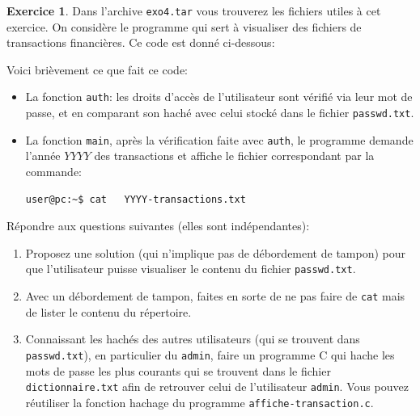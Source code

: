 \documentclass[a4paper,9pt]{article}
\theoremstyle{plain}
\theoremstyle{definition}
\newtheorem{exercice}{Exercice}
\begin{document}
\begin{exercice}
  Dans l'archive \verb|exo4.tar| vous trouverez les fichiers utiles à cet exercice. On considère le programme  qui sert à visualiser des fichiers de transactions financières. Ce code est donné ci-dessous:
  \begin{small}
    
    \end{small}
% 
% 
%
% 

Voici brièvement ce que fait ce code:
\begin{itemize}
\item La fonction \verb|auth|: les  droits d'accès de l'utilisateur sont vérifié via leur mot de passe, et en comparant son haché avec celui stocké dans le fichier \verb|passwd.txt|.
\item La fonction \verb|main|, après la vérification faite avec \verb|auth|, le programme demande l'année $YYYY$ des transactions et affiche le fichier correspondant par la commande:
\begin{verbatim}
user@pc:~$ cat   YYYY-transactions.txt
\end{verbatim}
\end{itemize}

Répondre aux questions suivantes (elles sont indépendantes):
\begin{enumerate}
\item Proposez une solution (qui n'implique pas de débordement de tampon) pour que l'utilisateur puisse visualiser le contenu du fichier \verb|passwd.txt|.
  \item Avec un débordement de tampon, faites en sorte de ne pas faire de  \verb|cat| mais de lister le contenu du répertoire.
\item Connaissant les hachés des autres utilisateurs (qui se trouvent dans  \verb|passwd.txt|), en particulier du \verb|admin|, faire un programme C qui hache les mots de passe les plus courants qui se trouvent dans le fichier \verb|dictionnaire.txt| afin de retrouver celui de l'utilisateur \verb|admin|. Vous pouvez réutiliser la fonction hachage du programme \verb|affiche-transaction.c|.
  \end{enumerate}


\end{exercice}
\end{document}
